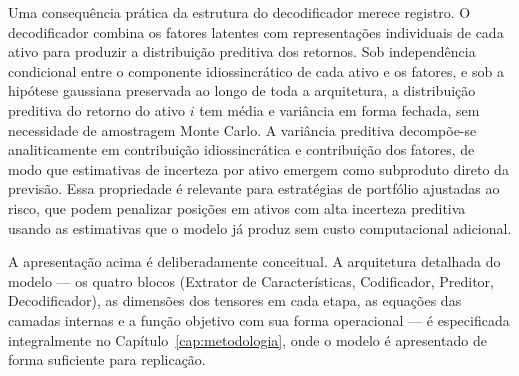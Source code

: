 Uma consequência prática da estrutura do decodificador merece registro. O decodificador combina os
fatores latentes com representações individuais de cada ativo para produzir a distribuição
preditiva dos retornos. Sob independência condicional entre o componente idiossincrático de cada
ativo e os fatores, e sob a hipótese gaussiana preservada ao longo de toda a arquitetura, a
distribuição preditiva do retorno do ativo $i$ tem média e variância em forma fechada, sem
necessidade de amostragem Monte Carlo. A variância preditiva decompõe-se analiticamente em
contribuição idiossincrática e contribuição dos fatores, de modo que estimativas de incerteza por
ativo emergem como subproduto direto da previsão. Essa propriedade é relevante para estratégias de
portfólio ajustadas ao risco, que podem penalizar posições em ativos com alta incerteza preditiva
usando as estimativas que o modelo já produz sem custo computacional adicional.

A apresentação acima é deliberadamente conceitual. A arquitetura detalhada do modelo --- os quatro
blocos (Extrator de Características, Codificador, Preditor, Decodificador), as dimensões dos
tensores em cada etapa, as equações das camadas internas e a função objetivo com sua forma
operacional --- é especificada integralmente no Capítulo~\ref{cap:metodologia}, onde o modelo é
apresentado de forma suficiente para replicação.

